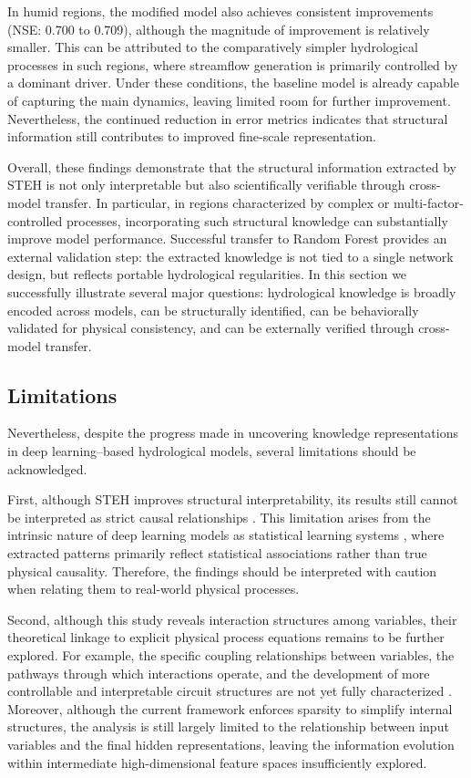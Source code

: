 In humid regions, the modified model also achieves consistent improvements (NSE: 0.700 to 0.709), although the magnitude of improvement is relatively smaller. This can be attributed to the comparatively simpler hydrological processes in such regions\cite{hess-25-2997-2021}, where streamflow generation is primarily controlled by a dominant driver. Under these conditions, the baseline model is already capable of capturing the main dynamics, leaving limited room for further improvement. Nevertheless, the continued reduction in error metrics indicates that structural information still contributes to improved fine-scale representation\cite{ABBASI2021125717}.

Overall, these findings demonstrate that the structural information extracted by STEH is not only interpretable but also scientifically verifiable through cross-model transfer. In particular, in regions characterized by complex or multi-factor-controlled processes, incorporating such structural knowledge can substantially improve model performance. Successful transfer to Random Forest provides an external validation step: the extracted knowledge is not tied to a single network design, but reflects portable hydrological regularities. In this section we successfully illustrate several major questions: hydrological knowledge is broadly encoded across models, can be structurally identified, can be behaviorally validated for physical consistency, and can be externally verified through cross-model transfer.

\subsection{Limitations}
Nevertheless, despite the progress made in uncovering knowledge representations in deep learning–based hydrological models, several limitations should be acknowledged.

First, although STEH improves structural interpretability, its results still cannot be interpreted as strict causal relationships \cite{lipton2018mythos}. This limitation arises from the intrinsic nature of deep learning models as statistical learning systems \cite{pearl2018theoreticalimpedimentsmachinelearning}, where extracted patterns primarily reflect statistical associations rather than true physical causality. Therefore, the findings should be interpreted with caution when relating them to real-world physical processes.

Second, although this study reveals interaction structures among variables, their theoretical linkage to explicit physical process equations remains to be further explored. For example, the specific coupling relationships between variables, the pathways through which interactions operate, and the development of more controllable and interpretable circuit structures are not yet fully characterized \cite{pach2025sparseautoencoderslearnmonosemantic}. Moreover, although the current framework enforces sparsity to simplify internal structures, the analysis is still largely limited to the relationship between input variables and the final hidden representations, leaving the information evolution within intermediate high-dimensional feature spaces insufficiently explored.

